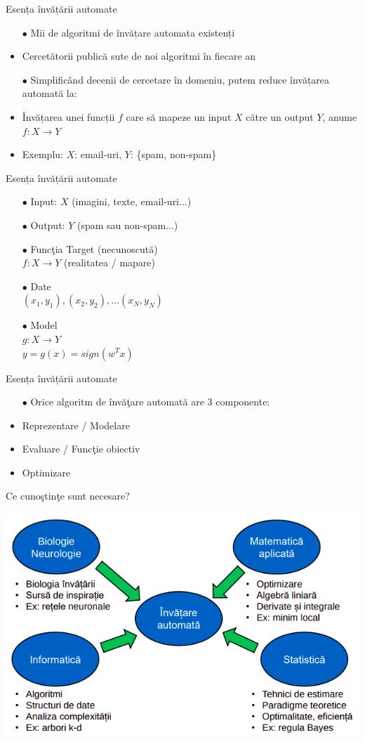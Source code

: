 \documentclass{beamer}
\begin{document}
\begin{frame}{Esența învățării automate}
\begin{itemize}
	\item[$\bullet$] Mii de algoritmi de învățare automata existenți
	\item Cercetătorii publică sute de noi algoritmi în fiecare an
	\item[$\bullet$] Simplificând decenii de cercetare în domeniu, putem reduce învățarea automată la:
	\item Învățarea unei funcții $f$ care să mapeze un input $X$ către un output $Y$, anume $f:X \to Y$
	\item Exemplu: $X$: email-uri, $Y$: \{spam, non-spam\}
\end{itemize}
\end{frame}

\begin{frame}{Esența învățării automate}
\begin{itemize}
	\item[$\bullet$] Input: $X$ \hfill (imagini, texte, email-uri...)
	\item[$\bullet$] Output: $Y$ \hfill (spam sau non-spam...)
	\item[$\bullet$] Funcţia Target (necunoscută)\\
	$f:X\to Y$ \hfill (realitatea /  mapare)
	\item[$\bullet$] Date\\
	$(x_1, y_1), (x_2, y_2), \ldots (x_N, y_N)$
	\item[$\bullet$] Model\\
	$g : X \to Y$\\
	$y = g(x) = sign(w^Tx)$
\end{itemize}
\end{frame}

\begin{frame}{Esența învățării automate}
\begin{itemize}
	\item[$\bullet$] Orice algoritm de învăţare automată are 3 componente:
	\item Reprezentare / Modelare
	\item Evaluare / Funcţie obiectiv
	\item Optimizare
\end{itemize}
\end{frame}

\begin{frame}{Ce cunoştinţe sunt necesare?}
\begin{center}
\includegraphics[scale=.45]{pic8.png}
\end{center}
\end{frame}
\end{document}
